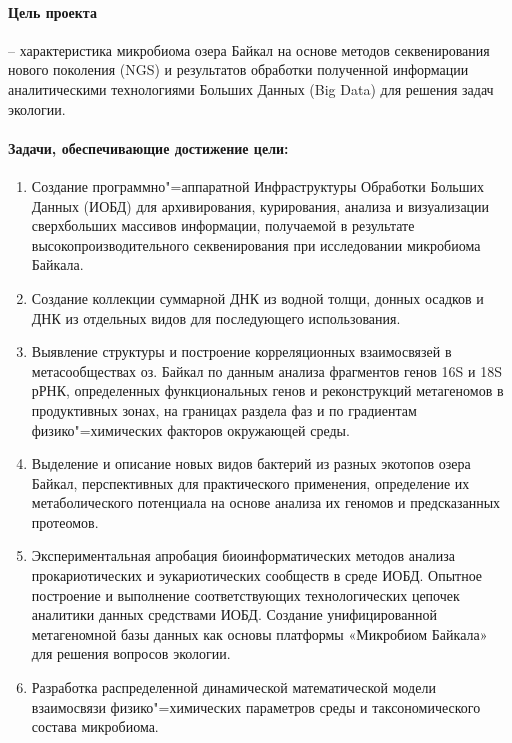 \documentclass[a4paper,12pt,openany,final]{extreport}
\makeatletter
\def\vhrulefill#1{\leavevmode\leaders\hrule\@height#1\hfill \kern\z@}
\newcommand\toprule{\noindent\vhrulefill{2pt}}
\newcommand\bottomrule{\noindent\vhrulefill{2pt}}
\makeatother
\begin{document}
\paragraph{Цель проекта} \hspace{-1.5ex}-- характеристика микробиома озера Байкал на основе методов секвенирования нового поколения (NGS) и результатов обработки полученной информации аналитическими технологиями Больших Данных (Big Data) для решения задач экологии.

\paragraph{Задачи, обеспечивающие достижение цели:}
\begin{enumerate}
\item Создание программно"=аппаратной Инфраструктуры Обработки Больших Данных (ИОБД) для архивирования, курирования, анализа и визуализации сверхбольших массивов информации, получаемой в результате высокопроизводительного секвенирования при исследовании микробиома Байкала.

\item Создание коллекции суммарной ДНК из водной толщи, донных осадков и ДНК из отдельных видов для последующего использования.

\item Выявление структуры и построение корреляционных взаимосвязей в метасообществах оз. Байкал по данным анализа фрагментов генов 16S и 18S рРНК, определенных функциональных генов и реконструкций метагеномов в продуктивных зонах, на границах раздела фаз и по градиентам физико"=химических факторов окружающей среды.

\item Выделение и описание новых видов бактерий из разных экотопов озера Байкал, перспективных для практического применения, определение их метаболического потенциала на основе анализа их геномов и предсказанных протеомов.

\item Экспериментальная апробация биоинформатических методов анализа прокариотических и эукариотических сообществ в среде ИОБД. Опытное построение и выполнение соответствующих технологических цепочек аналитики данных средствами ИОБД. Создание унифицированной метагеномной базы данных как основы платформы «Микробиом Байкала» для решения вопросов экологии.

\item Разработка распределенной динамической математической модели взаимосвязи физико"=химических параметров среды и таксономического состава микробиома.\strut
\end{enumerate}
\clearpage{}
\end{document}
